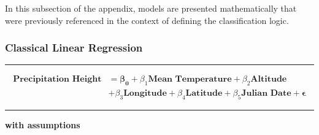 \documentclass[
  12pt,
]{article}
\begin{document}
In this subsection of the appendix, models are presented mathematically
that were previously referenced in the context of defining the
classification logic.

\hypertarget{classical-linear-regression-1}{%
\subsubsection{Classical Linear
Regression}\label{classical-linear-regression-1}}

\begin{center}
\rule{1\textwidth}{0.4pt}
\end{center}

\vspace{-35pt}

\begin{equation}\label{eq:linear_regression_model_equation}   
\begin{aligned}
\textbf{Precipitation Height} &= \mathbf{\beta_0} + \beta_1 \textbf{Mean Temperature} + \beta_2 \textbf{Altitude} \\
& + \beta_3 \textbf{Longitude} + \beta_4 \textbf{Latitude} + \beta_5 \textbf{Julian Date} + \mathbf{\epsilon}
\end{aligned}
\end{equation}

\begin{center}
\rule{1\textwidth}{0.4pt}
\end{center}

\begin{center}
{\textbf{with assumptions}}
\end{center}
\end{document}
